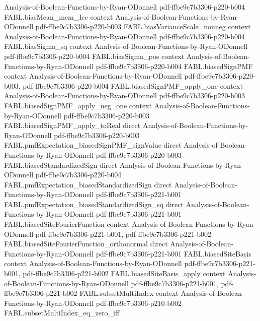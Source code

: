 \begin{theorem}
  {Analysis-of-Boolean-Functions-by-Ryan-ODonnell}
  {pdf-ffbe9c7b3306-p220-b004}
\proofstep
  {FABL.biasMean_mem_Icc}
  {context}
  {Analysis-of-Boolean-Functions-by-Ryan-ODonnell}
  {pdf-ffbe9c7b3306-p220-b003}
\proofstep
  {FABL.biasVarianceScale_nonneg}
  {context}
  {Analysis-of-Boolean-Functions-by-Ryan-ODonnell}
  {pdf-ffbe9c7b3306-p220-b004}
\proofstep
  {FABL.biasSigma_sq}
  {context}
  {Analysis-of-Boolean-Functions-by-Ryan-ODonnell}
  {pdf-ffbe9c7b3306-p220-b004}
\proofstep
  {FABL.biasSigma_pos}
  {context}
  {Analysis-of-Boolean-Functions-by-Ryan-ODonnell}
  {pdf-ffbe9c7b3306-p220-b004}
\proofstep
  {FABL.biasedSignPMF}
  {context}
  {Analysis-of-Boolean-Functions-by-Ryan-ODonnell}
  {pdf-ffbe9c7b3306-p220-b003,
    pdf-ffbe9c7b3306-p220-b004}
\proofstep
  {FABL.biasedSignPMF_apply_one}
  {context}
  {Analysis-of-Boolean-Functions-by-Ryan-ODonnell}
  {pdf-ffbe9c7b3306-p220-b003}
\proofstep
  {FABL.biasedSignPMF_apply_neg_one}
  {context}
  {Analysis-of-Boolean-Functions-by-Ryan-ODonnell}
  {pdf-ffbe9c7b3306-p220-b003}
\proofstep
  {FABL.biasedSignPMF_apply_toReal}
  {direct}
  {Analysis-of-Boolean-Functions-by-Ryan-ODonnell}
  {pdf-ffbe9c7b3306-p220-b003}
\proofstep
  {FABL.pmfExpectation_biasedSignPMF_signValue}
  {direct}
  {Analysis-of-Boolean-Functions-by-Ryan-ODonnell}
  {pdf-ffbe9c7b3306-p220-b003}
\proofstep
  {FABL.biasedStandardizedSign}
  {direct}
  {Analysis-of-Boolean-Functions-by-Ryan-ODonnell}
  {pdf-ffbe9c7b3306-p220-b004}
\proofstep
  {FABL.pmfExpectation_biasedStandardizedSign}
  {direct}
  {Analysis-of-Boolean-Functions-by-Ryan-ODonnell}
  {pdf-ffbe9c7b3306-p221-b001}
\proofstep
  {FABL.pmfExpectation_biasedStandardizedSign_sq}
  {direct}
  {Analysis-of-Boolean-Functions-by-Ryan-ODonnell}
  {pdf-ffbe9c7b3306-p221-b001}
\proofstep
  {FABL.biasedSiteFourierFunction}
  {context}
  {Analysis-of-Boolean-Functions-by-Ryan-ODonnell}
  {pdf-ffbe9c7b3306-p221-b001,
    pdf-ffbe9c7b3306-p221-b002}
\proofstep
  {FABL.biasedSiteFourierFunction_orthonormal}
  {direct}
  {Analysis-of-Boolean-Functions-by-Ryan-ODonnell}
  {pdf-ffbe9c7b3306-p221-b001}
\proofstep
  {FABL.biasedSiteBasis}
  {context}
  {Analysis-of-Boolean-Functions-by-Ryan-ODonnell}
  {pdf-ffbe9c7b3306-p221-b001,
    pdf-ffbe9c7b3306-p221-b002}
\proofstep
  {FABL.biasedSiteBasis_apply}
  {context}
  {Analysis-of-Boolean-Functions-by-Ryan-ODonnell}
  {pdf-ffbe9c7b3306-p221-b001,
    pdf-ffbe9c7b3306-p221-b002}
\proofstep
  {FABL.subsetMultiIndex}
  {context}
  {Analysis-of-Boolean-Functions-by-Ryan-ODonnell}
  {pdf-ffbe9c7b3306-p210-b002}
\proofstep
  {FABL.subsetMultiIndex_eq_zero_iff}

\end{theorem}
